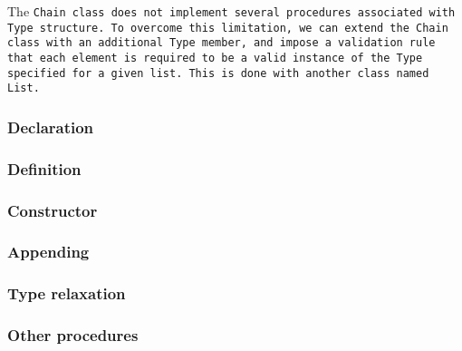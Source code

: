 \def\Subsubsection#1{\subsubsection{#1}
}

The \tt{Chain} class does not implement several
procedures associated with \tt{Type} structure.
To overcome this limitation, we can extend the \tt{Chain} class with an
additional \tt{Type} member, and impose a validation rule that each element is
required to be a valid instance of the \tt{Type} specified for a given list.
This is done with another class named  \tt{List}.

\enlargethispage*{\baselineskip}
\Subsubsection{Declaration}

\Subsubsection{Definition}

\Subsubsection{Constructor}

\Subsubsection{Appending}

\Subsubsection{Type relaxation}

\Subsubsection{Other procedures}
